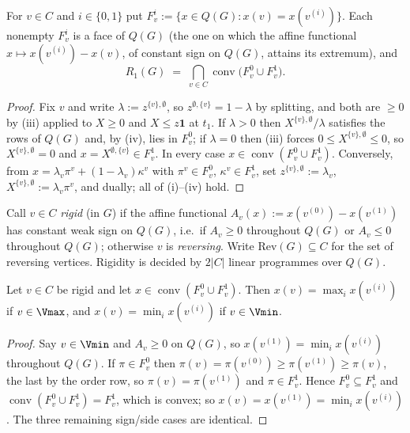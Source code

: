 \begin{lemma}\label{cl:faces}
For $v\in C$ and $i\in\{0,1\}$ put
$F_v^{i}:=\{x\in Q(G):x(v)=x(v^{(i)})\}$. Each nonempty $F_v^{i}$ is a face of $Q(G)$
(the one on which the affine functional $x\mapsto x(v^{(i)})-x(v)$, of constant
sign on $Q(G)$, attains its extremum), and
\[
  R_1(G)\;=\;\bigcap_{v\in C}\operatorname{conv}\bigl(F_v^{0}\cup F_v^{1}\bigr).
\]
\end{lemma}

\begin{proof}
Fix $v$ and write $\lambda:=z^{\{v\},\emptyset}$, so $z^{\emptyset,\{v\}}
=1-\lambda$ by splitting, and both are $\ge0$ by (iii) applied to $X\ge0$ and
$X\le z\mathbf 1$ at $t_1$. If $\lambda>0$ then $X^{\{v\},\emptyset}/\lambda$
satisfies the rows of $Q(G)$ and, by (iv), lies in $F_v^{0}$; if $\lambda=0$
then (iii) forces $0\le X^{\{v\},\emptyset}\le0$, so
$X^{\{v\},\emptyset}=0$ and $x=X^{\emptyset,\{v\}}\in F_v^{1}$. In every case
$x\in\operatorname{conv}(F_v^{0}\cup F_v^{1})$. Conversely, from
$x=\lambda_v\pi^{v}+(1-\lambda_v)\kappa^{v}$ with $\pi^{v}\in F_v^{0}$,
$\kappa^{v}\in F_v^{1}$, set $z^{\{v\},\emptyset}:=\lambda_v$,
$X^{\{v\},\emptyset}:=\lambda_v\pi^{v}$, and dually; all of (i)--(iv) hold.
\end{proof}

\begin{definition}\label{cl:rigid-def}
Call $v\in C$ \emph{rigid} (in $G$) if the affine functional
$A_v(x):=x(v^{(0)})-x(v^{(1)})$ has constant weak sign on $Q(G)$, i.e.\ if
$A_v\ge0$ throughout $Q(G)$ or $A_v\le0$ throughout $Q(G)$; otherwise $v$ is
\emph{reversing}. Write $\mathrm{Rev}(G)\subseteq C$ for the set of reversing vertices.
Rigidity is decided by $2|C|$ linear programmes over $Q(G)$.
\end{definition}

\begin{lemma}\label{cl:rigid-pin}
Let $v\in C$ be rigid and let $x\in\operatorname{conv}(F_v^{0}\cup F_v^{1})$.
Then $x(v)=\max_ix(v^{(i)})$ if $v\in\Vmax$, and $x(v)=\min_ix(v^{(i)})$ if
$v\in\Vmin$.
\end{lemma}

\begin{proof}
Say $v\in\Vmin$ and $A_v\ge0$ on $Q(G)$, so $x(v^{(1)})=\min_ix(v^{(i)})$
throughout $Q(G)$. If $\pi\in F_v^{0}$ then
$\pi(v)=\pi(v^{(0)})\ge\pi(v^{(1)})\ge\pi(v)$, the last by the order row, so
$\pi(v)=\pi(v^{(1)})$ and $\pi\in F_v^{1}$. Hence $F_v^{0}\subseteq F_v^{1}$
and $\operatorname{conv}(F_v^{0}\cup F_v^{1})=F_v^{1}$, which is convex; so
$x(v)=x(v^{(1)})=\min_ix(v^{(i)})$. The three remaining sign/side cases are
identical.
\end{proof}

